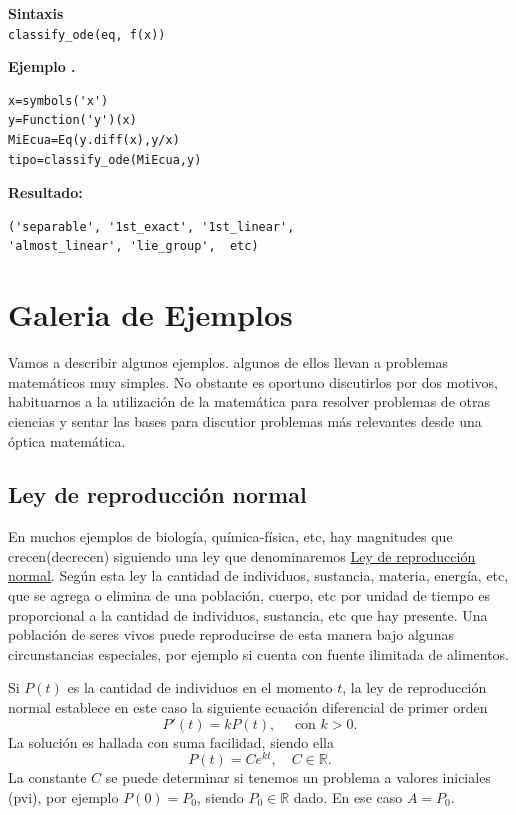 \documentclass{article}
\newcommand{\rr}{\mathbb{R}}
\newcounter{ejemplo_cont}
\newenvironment{ejemplo}{\noindent\textbf{Ejemplo  \arabic{ejemplo_cont}.} }{\addtocounter{ejemplo_cont}{1}}
\begin{document}
\begin{codigo}
\textbf{Sintaxis}\\
\texttt{classify\_ode(eq, f(x))}\\

\end{codigo}
\begin{ejemplo}

\end{ejemplo}

\begin{lstlisting}
x=symbols('x')
y=Function('y')(x)
MiEcua=Eq(y.diff(x),y/x)
tipo=classify_ode(MiEcua,y)
\end{lstlisting}
\textbf{Resultado:}\\
\begin{verbatim}
('separable', '1st_exact', '1st_linear', 
'almost_linear', 'lie_group',  etc)
\end{verbatim}




\section{Galeria de Ejemplos}

Vamos a describir algunos ejemplos. algunos de ellos llevan a problemas matemáticos muy simples. No obstante es oportuno discutirlos por dos motivos, habituarnos a la utilización de la matemática para resolver problemas de otras ciencias y sentar las bases para discutior problemas más relevantes desde una óptica matemática.

\subsection{Ley de reproducción normal}
  En muchos ejemplos de biología, química-física, etc, hay magnitudes que crecen(decrecen) siguiendo una ley que denominaremos
\href{http://es.wikipedia.org/wiki/Crecimiento_exponencial}{Ley de reproducción  normal}. Según esta ley la cantidad de individuos, sustancia, materia,
energía, etc, que se agrega o elimina de una población, cuerpo, etc por unidad de tiempo es proporcional a la cantidad de individuos, sustancia, etc que hay presente.   Una población de seres vivos puede reproducirse de esta manera bajo algunas circunstancias
especiales, por ejemplo si cuenta con fuente ilimitada de alimentos.

  Si $P(t)$ es la cantidad de individuos en el momento $t$, la ley de reproducción normal establece
en este caso la siguiente ecuación diferencial de primer orden
\[P'(t)=kP(t),\quad\text{ con } k>0.\]
La solución es hallada con suma facilidad, siendo ella 
\[\boxed{P(t)=Ce^{kt},\quad C\in\rr.}\]
La constante  $C$ se puede determinar si tenemos un problema a valores iniciales (pvi), por ejemplo $P(0)=P_0$, siendo $P_0\in\rr$ dado. En ese caso
$A=P_0$. 
\end{document}
